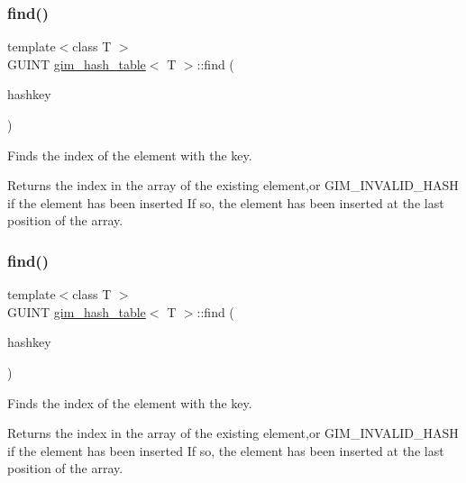\subsubsection{\texorpdfstring{find()}{find()}\hspace{0.1cm}{\footnotesize\ttfamily [1/2]}}
{\footnotesize\ttfamily template$<$class T $>$ \\
G\+U\+I\+NT \hyperlink{classgim__hash__table}{gim\+\_\+hash\+\_\+table}$<$ T $>$\+::find (\begin{DoxyParamCaption}\item[{G\+U\+I\+NT}]{hashkey }\end{DoxyParamCaption})\hspace{0.3cm}{\ttfamily [inline]}}



Finds the index of the element with the key. 

\begin{DoxyReturn}{Returns}
the index in the array of the existing element,or G\+I\+M\+\_\+\+I\+N\+V\+A\+L\+I\+D\+\_\+\+H\+A\+SH if the element has been inserted If so, the element has been inserted at the last position of the array. 
\end{DoxyReturn}
\mbox{\label{classgim__hash__table_a14261b2d7de34188f8bc5179e4d60760}} 
\subsubsection{\texorpdfstring{find()}{find()}\hspace{0.1cm}{\footnotesize\ttfamily [2/2]}}
{\footnotesize\ttfamily template$<$class T $>$ \\
G\+U\+I\+NT \hyperlink{classgim__hash__table}{gim\+\_\+hash\+\_\+table}$<$ T $>$\+::find (\begin{DoxyParamCaption}\item[{G\+U\+I\+NT}]{hashkey }\end{DoxyParamCaption})\hspace{0.3cm}{\ttfamily [inline]}}



Finds the index of the element with the key. 

\begin{DoxyReturn}{Returns}
the index in the array of the existing element,or G\+I\+M\+\_\+\+I\+N\+V\+A\+L\+I\+D\+\_\+\+H\+A\+SH if the element has been inserted If so, the element has been inserted at the last position of the array. 
\end{DoxyReturn}
\mbox{\label{classgim__hash__table_a40b5c46a0117da3948cd1b093f185321}} 
